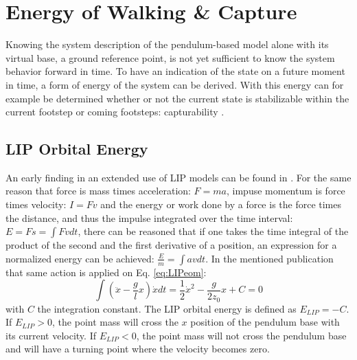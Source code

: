 \section{Energy of Walking \& Capture}\label{sec:ewalking}
Knowing the system description of the pendulum-based model alone with its virtual base, a ground reference point, is not yet sufficient to know the system behavior forward in time. To have an indication of the state on a future moment in time, a form of energy of the system can be derived. With this energy can for example be determined whether or not the current state is stabilizable within the current footstep or coming footsteps: capturability \cite{koolen2012capturability}. 

\subsection{LIP Orbital Energy}\label{subsec:liporbit}
An early finding in an extended use of \ac{LIP} models can be found in \cite{kajita1992dynamic}. For the same reason that force is mass times acceleration: $F=ma$, impuse momentum is force times velocity: $I=Fv$ and the energy or work done by a force is the force times the distance, and thus the impulse integrated over the time interval: $E = Fs = \int Fv dt$, there can be reasoned that if one takes the time integral of the product of the second and the first derivative of a position, an expression for a normalized energy can be achieved: $\frac{E}{m}=\int av dt$. In the mentioned publication that same action is applied on Eq. \eqref{eq:LIPeom}:
\begin{equation}
\int (\ddot{x}-\frac{g}{l}x)\dot{x} dt = \frac{1}{2}\dot{x}^2-\frac{g}{2z_0}x +C=0
\label{eq:Elip}
\end{equation}
with $C$ the integration constant. The \ac{LIP} orbital energy is defined as $E_{LIP}=-C$. If $E_{LIP}>0$, the point mass will cross the $x$ position of the pendulum base with its current velocity. If $E_{LIP}<0$, the point mass will not cross the pendulum base and will have a turning point where the velocity becomes zero.

